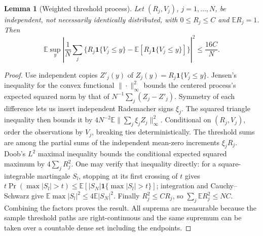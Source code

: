 \documentclass[11pt]{article}
\newtheorem{lemma}[theorem]{Lemma}
\theoremstyle{remark}\newtheorem{remark}[theorem]{Remark}
\newcommand{\E}{\mathbb E}
\newcommand{\Ind}{\mathbf 1}
\begin{document}
\begin{lemma}[Weighted threshold process]\label{threshold}
Let $(R_j,V_j)$, $j=1,\ldots,N$, be independent, not necessarily identically distributed, with $0\leq R_j\leq C$ and $\E R_j=1$. Then
\[
 \E\sup_y\left|\frac1N\sum_j
       \{R_j\Ind\{V_j\leq y\}-\E[R_j\Ind\{V_j\leq y\}]\}\right|^2
                       \leq\frac{16C}{N}.
\]
\end{lemma}
\begin{proof}
Use independent copies $Z'_j(y)$ of $Z_j(y)=R_j\Ind\{V_j\leq y\}$. Jensen's inequality for the convex functional $\|\cdot\|_\infty^2$ bounds the centered process's expected squared norm by that of $N^{-1}\sum_j(Z_j-Z'_j)$. Symmetry of each difference lets us insert independent Rademacher signs $\xi_j$. The squared triangle inequality then bounds it by
$4N^{-2}\E\|\sum_j\xi_j Z_j\|_\infty^2$.
Conditional on $(R_j,V_j)$, order the observations by $V_j$, breaking ties deterministically. The threshold sums are among the partial sums of the independent mean-zero increments $\xi_jR_j$. Doob's $L^2$ maximal inequality bounds the conditional expected squared maximum by $4\sum_jR_j^2$. One may verify that inequality directly: for a square-integrable martingale $S_l$, stopping at its first crossing of $t$ gives $t\Pr(\max|S_l|>t)\leq\E[|S_N|\Ind\{\max|S_l|>t\}]$; integration and Cauchy--Schwarz give $\E\max|S_l|^2\leq4\E|S_N|^2$. Finally $R_j^2\leq CR_j$, so $\sum_j\E R_j^2\leq NC$. Combining the factors proves the result. All suprema are measurable because the sample threshold paths are right-continuous and the same supremum can be taken over a countable dense set including the endpoints.
\end{proof}
\end{document}
